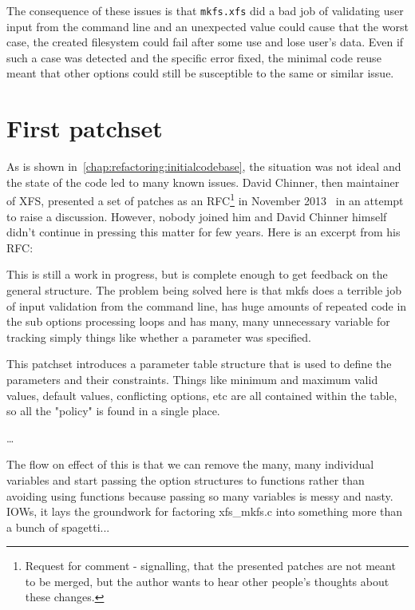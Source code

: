 The consequence of these issues is that {\tt mkfs.xfs} did a bad job of
validating user input from the command line and an unexpected value could
cause that the worst case, the created filesystem could fail after some use
and lose user's data. Even if such a case was detected and the specific
error fixed, the minimal code reuse meant that other options could still be
susceptible to the same or similar issue.

\section{First patchset}\label{chap:refactoring:first}

As is shown in~\ref{chap:refactoring:initialcodebase}, the situation was not ideal and the
state of the code led to many known issues. David Chinner, then maintainer
of XFS, presented a set of patches as an RFC\footnote{Request for comment -
	signalling, that the presented patches are not meant to be merged,
but the author wants to hear other people's thoughts about these changes.}
in November 2013~\cite{davidsPatches} in an attempt to raise a discussion.
However, nobody joined him and David Chinner himself didn't continue in
pressing this matter for few years. Here is an excerpt from his RFC:

\begin{displayquote}
This is still a work in progress, but is complete enough to get
feedback on the general structure. The problem being solved here is
that mkfs does a terrible job of input validation from the command
line, has huge amounts of repeated code in the sub options
processing loops and has many, many unnecessary variable for
tracking simply things like whether a parameter was specified.

This patchset introduces a parameter table structure that is used to
define the parameters and their constraints. Things like minimum and
maximum valid values, default values, conflicting options, etc are
all contained within the table, so all the "policy" is found in a
single place.

\ldots

The flow on effect of this is that we can remove the many, many
individual variables and start passing the option structures to
functions rather than avoiding using functions because passing so
many variables is messy and nasty. IOWs, it lays the groundwork for
factoring xfs\_mkfs.c into something more than a bunch of spagetti...
\end{displayquote}

